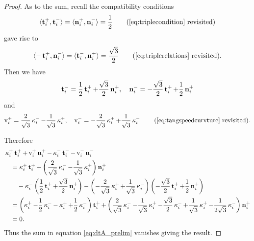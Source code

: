 \documentclass[12pt]{amsart}
\begin{document}
\begin{proof}
As to the sum, recall the compatibility conditions
\[
\ip{\tang^+_i}{\tang^-_i} = \ip{\nor^+_i}{\nor^-_i} = \frac{1}{2} \tag{\ref{eq:triplecondition} revisited}
\]
gave rise to
\[
\ip{-\tang^+_i}{\nor^-_i} = \ip{\tang^-_i}{\nor^+_i} = \frac{\sqrt{3}}{2} \tag{\ref{eq:triplerelations} revisited}.
\]
Then we have
\[
\operatorname{\mathbf{t}}^-_i = \frac{1}{2} \operatorname{\mathbf{t}}^+_i + \frac{\sqrt{3}}{2} \operatorname{\mathbf{n}}^+_i, \quad \operatorname{\mathbf{n}}^-_i = -\frac{\sqrt{3}}{2} \operatorname{\mathbf{t}}^+_i + \frac{1}{2} \operatorname{\mathbf{n}}^+_i
\]
and
\[
\tangspeed_i^+ = \frac{2}{\sqrt{3}} \curvecurv_i^- - \frac{1}{\sqrt{3}} \curvecurv_i^+, \quad \tangspeed_i^- = -\frac{2}{\sqrt{3}} \curvecurv_i^+ + \frac{1}{\sqrt{3}} \curvecurv_i^- \tag{\ref{eq:tangspeedcurvture} revisited}.
\]

Therefore
\[
\begin{split}
& \operatorname{\kappa}_i^+ \operatorname{\mathbf{t}}_i^+ + \operatorname{v}_i^+ \operatorname{\mathbf{n}}_i^+ - \operatorname{\kappa}_i^- \operatorname{\mathbf{t}}_i^- - \operatorname{v}_i^- \operatorname{\mathbf{n}}_i^- \\
&\quad = \operatorname{\kappa}_i^+ \operatorname{\mathbf{t}}_i^+ + \left(\frac{2}{\sqrt{3}} \operatorname{\kappa}_i^- - \frac{1}{\sqrt{3}} \operatorname{\kappa}_i^+\right) \operatorname{\mathbf{n}}_i^+ \\
&\quad\quad - \operatorname{\kappa}_i^- \left(\frac{1}{2} \operatorname{\mathbf{t}}^+_i + \frac{\sqrt{3}}{2} \operatorname{\mathbf{n}}^+_i\right) - \left(-\frac{2}{\sqrt{3}} \operatorname{\kappa}_i^+ + \frac{1}{\sqrt{3}} \operatorname{\kappa}_i^-\right)\left(-\frac{\sqrt{3}}{2} \operatorname{\mathbf{t}}^+_i + \frac{1}{2} \operatorname{\mathbf{n}}^+_i\right) \\
&\quad = \left(\operatorname{\kappa}_i^+ - \frac{1}{2} \operatorname{\kappa}_i^- - \operatorname{\kappa}_i^+ + \frac{1}{2}\operatorname{\kappa}_i^-\right) \operatorname{\mathbf{t}}^+_i + \left(\frac{2}{\sqrt{3}} \operatorname{\kappa}_i^- - \frac{1}{\sqrt{3}} \operatorname{\kappa}_i^+ - \frac{\sqrt{3}}{2} \operatorname{\kappa}_i^- + \frac{1}{\sqrt{3}} \operatorname{\kappa}_i^+ - \frac{1}{2\sqrt{3}} \operatorname{\kappa}_i^-\right) \operatorname{\mathbf{n}}^+_i \\
&\quad = 0.
\end{split}
\]
Thus the sum in equation \eqref{eq:dtA_prelim} vanishes giving the result.
\end{proof}
\end{document}
